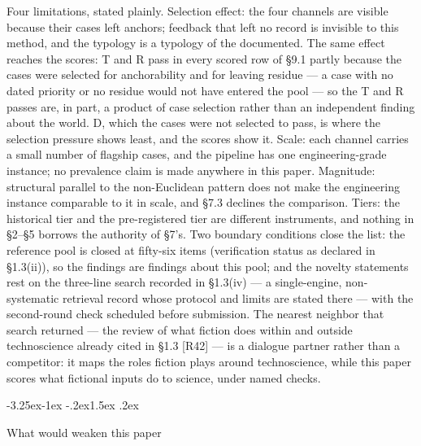 \documentclass[11pt,a4paper]{article}
\makeatletter
\renewcommand\subsection{\@startsection{subsection}{2}{\z@}%
  {-3.25ex\@plus -1ex \@minus -.2ex}{1.5ex \@plus .2ex}%
  {\normalfont\large\bfseries\raggedright}}
\makeatother
\begin{document}
Four limitations, stated plainly. Selection effect: the four channels are visible because their cases left anchors; feedback that left no record is invisible to this method, and the typology is a typology of the documented. The same effect reaches the scores: T and R pass in every scored row of §9.1 partly because the cases were selected for anchorability and for leaving residue — a case with no dated priority or no residue would not have entered the pool — so the T and R passes are, in part, a product of case selection rather than an independent finding about the world. D, which the cases were not selected to pass, is where the selection pressure shows least, and the scores show it. Scale: each channel carries a small number of flagship cases, and the pipeline has one engineering-grade instance; no prevalence claim is made anywhere in this paper. Magnitude: structural parallel to the non-Euclidean pattern does not make the engineering instance comparable to it in scale, and §7.3 declines the comparison. Tiers: the historical tier and the pre-registered tier are different instruments, and nothing in §2–§5 borrows the authority of §7's. Two boundary conditions close the list: the reference pool is closed at fifty-six items (verification status as declared in §1.3(ii)), so the findings are findings about this pool; and the novelty statements rest on the three-line search recorded in §1.3(iv) — a single-engine, non-systematic retrieval record whose protocol and limits are stated there — with the second-round check scheduled before submission. The nearest neighbor that search returned — the review of what fiction does within and outside technoscience already cited in §1.3 [R42] — is a dialogue partner rather than a competitor: it maps the roles fiction plays around technoscience, while this paper scores what fictional inputs do to science, under named checks.

\subsection{What would weaken this paper}
\end{document}
